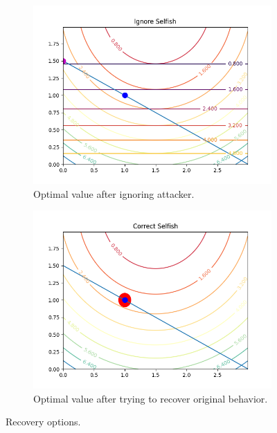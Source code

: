 \documentclass[../main.tex]{subfiles}
\begin{document}
\begin{figure}[h]
  \centering
  \begin{subfigure}{0.45\textwidth}
    \includegraphics[width=\textwidth]{../img/ignoreX.png}
    \caption{Optimal value after ignoring attacker.}
    \label{fig:third}
  \end{subfigure}
  \hfill
  \begin{subfigure}{0.45\textwidth}
    \includegraphics[width=\textwidth]{../img/correctX.png}
    \caption{Optimal value after trying to recover original behavior.}
    \label{fig:third}
  \end{subfigure}

  \caption{Recovery options.}\label{fig:figures}
\end{figure}
\end{document}
